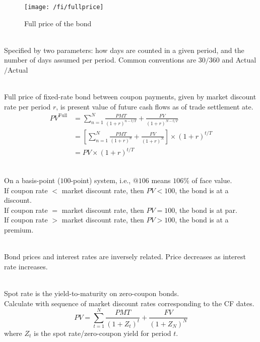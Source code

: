 \begin{figure}[H]
\centering
\texttt{[image: /fi/fullprice]}
\caption{Full price of the bond}
\end{figure}

\begin{remark} \\
Specified by two parameters: how days are counted in a given period, and the number of days assumed per period. Common conventions are $30/360$ and Actual$/$Actual
\end{remark}

\begin{remark} \\
Full price of fixed-rate bond between coupon payments, given by market discount rate per period $r$, is present value of future cash flows as of trade settlement ate.
\begin{align}
PV^{\text{Full}} &= \sum\limits_{n=1}^N \frac{PMT}{(1+r)^{n-t/T}} + \frac{FV}{(1+r)^{N-t/T}} \nonumber \\
&= \left[ \sum\limits_{n=1}^N \frac{PMT}{(1+r)^{n}} + \frac{FV}{(1+r)^{N}} \right] \times (1+r)^{t/T} \nonumber \\
&= PV \times (1+r)^{t/T} \nonumber
\end{align}
\end{remark}


\begin{remark} \\
On a basis-point ($100$-point) system, i.e., $@106$ means $106\%$ of face value.\\
If coupon rate $<$ market discount rate, then $PV < 100$, the bond is at a discount.\\
If coupon rate $=$ market discount rate, then $PV = 100$, the bond is at par.\\
If coupon rate $>$ market discount rate, then $PV > 100$, the bond is at a premium.
\end{remark}

\begin{remark} \\
Bond prices and interest rates are inversely related. Price decreases as interest rate increases.
\end{remark}

\begin{remark} \\
Spot rate is the yield-to-maturity on zero-coupon bonds.\\
Calculate with sequence of market discount rates corresponding to the CF dates.
\begin{equation}
PV = \sum\limits_{t=1}^N \frac{PMT}{(1+Z_t)^{t}} + \frac{FV}{(1+Z_N)^{N}} \nonumber
\end{equation}
where $Z_t$ is the spot rate/zero-coupon yield for period $t$.
\end{remark}


